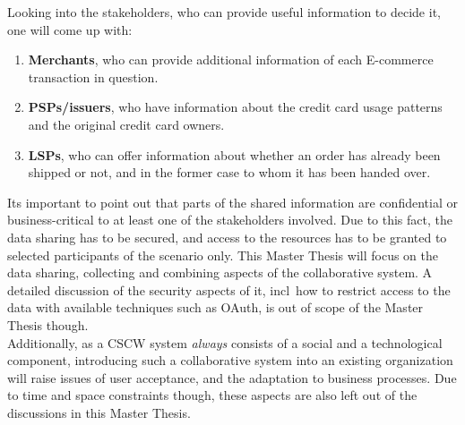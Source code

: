 Looking into the stakeholders, who can provide useful information to decide it, one will come up with:\@

\begin{enumerate}
    \item \textbf{Merchants}, who can provide additional information of each \gls{E-commerce} transaction in question.
    \item \textbf{\gls{PSP}s/issuers}, who have information about the credit card usage patterns and the original credit card owners.
    \item \textbf{\gls{LSP}s}, who can offer information about whether an order has already been shipped or not, and in the former case to whom it has been handed over.
\end{enumerate}

Its important to point out that parts of the shared information are confidential or business-critical to at least one of the stakeholders involved. Due to this fact, the data sharing has to be secured, and access to the resources has to be granted to selected participants of the scenario only. This Master Thesis will focus on the data sharing, collecting and combining aspects of the collaborative system. A detailed discussion of the security aspects of it, \gls{incl}\ how to restrict access to the data with available techniques such as \gls{OAuth}, is out of scope of the Master Thesis though.\\

Additionally, as a \gls{CSCW} system \emph{always} consists of a social and a technological component, introducing such a collaborative system into an existing organization will raise issues of user acceptance, and the adaptation to business processes. Due to time and space constraints though, these aspects are also left out of the discussions in this Master Thesis.

